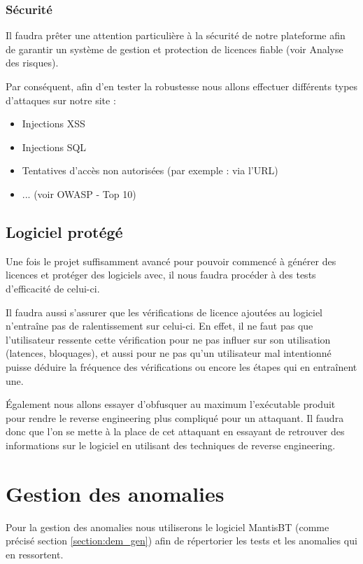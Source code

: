 \subsection{Sécurité}
Il faudra prêter une attention particulière à la sécurité de notre plateforme afin de garantir
un système de gestion et protection de licences fiable (voir Analyse des risques).

Par conséquent, afin d'en tester la robustesse nous allons effectuer différents types d'attaques
sur notre site :
\begin{itemize}
    \item Injections XSS
    \item Injections SQL
    \item Tentatives d'accès non autorisées (par exemple : via l'URL)
    \item ... (voir OWASP - Top 10)
\end{itemize}


\section{Logiciel protégé}

Une fois le projet suffisamment avancé pour pouvoir commencé à générer des licences et protéger
des logiciels avec, il nous faudra procéder à des tests d'efficacité de celui-ci.

Il faudra aussi s'assurer que les vérifications de licence ajoutées au logiciel n'entraîne pas de
ralentissement sur celui-ci. En effet, il ne faut pas que l'utilisateur ressente cette vérification
pour ne pas influer sur son utilisation (latences, bloquages), et aussi pour ne pas qu'un
utilisateur mal intentionné puisse déduire la fréquence des vérifications ou encore les étapes
qui en entraînent une.\newline

Également nous allons essayer d'obfusquer au maximum l'exécutable produit pour rendre le reverse
engineering plus compliqué pour un attaquant. Il faudra donc que l'on se mette à la place de cet
attaquant en essayant de retrouver des informations sur le logiciel en utilisant des techniques
de reverse engineering.


\chapter{Gestion des anomalies}
Pour la gestion des anomalies nous utiliserons le logiciel MantisBT (comme précisé section
\ref{section:dem_gen}) afin de répertorier les tests et les anomalies qui en ressortent.\newline

